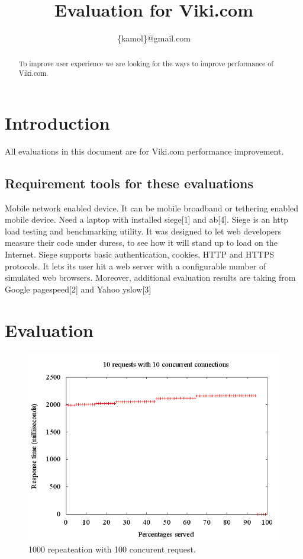 \documentclass[conference]{/Users/kamol/Dropbox/PhD/papers/IEEEtran2/IEEEtran}
\begin{document}
\title{Evaluation for Viki.com}
\author{
\{{kamol\}@gmail.com}
}

\maketitle

\begin{abstract}
To improve user experience we are looking for the ways to improve performance of Viki.com.
\end{abstract}

\section{Introduction}
All evaluations in this document are for Viki.com performance improvement. 

\subsection{Requirement tools for these evaluations}
Mobile network enabled device. It can be mobile broadband or tethering enabled mobile device.
Need a laptop with installed {siege}[1] and {ab}[4]. Siege is an http load testing and benchmarking utility. 
It was designed to let web developers measure their code under duress, to see how it will stand up to load on the Internet. 
Siege supports basic authentication, cookies, HTTP and HTTPS protocols. 
It lets its user hit a web server with a configurable number of simulated web browsers.
Moreover, additional evaluation results are taking from Google {pagespeed}[2] and Yahoo {yslow}[3]

\section{Evaluation}
\pgfplotsset{}

\begin{figure}[ht]
\begin{minipage}[b]{\linewidth}\centering
\includegraphics[width=\textwidth]{include/gnu/10_10.png}
\end{minipage}
\caption{1000 repeateation with 100 concurent request.}
\label{fig:my_read_latency}
\end{figure}
\end{document}
